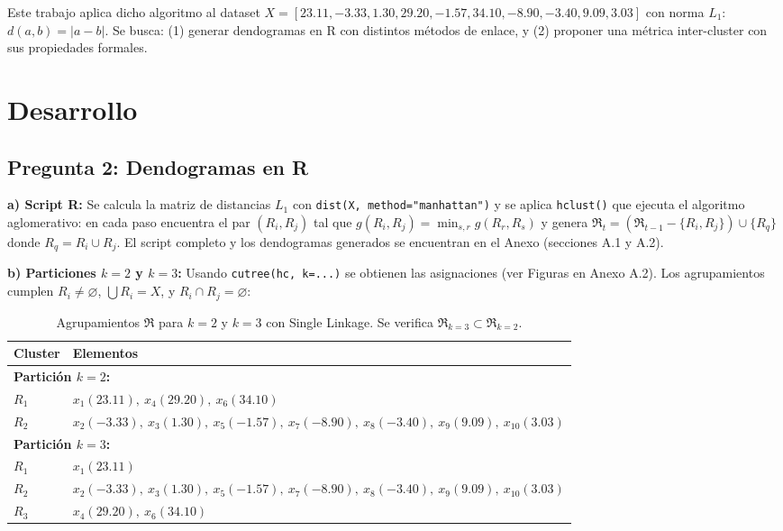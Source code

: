 \documentclass[10pt,a4paper]{article}
\begin{document}
Este trabajo aplica dicho algoritmo al dataset $X = [23.11, -3.33, 1.30, 29.20, -1.57, 34.10, -8.90, -3.40, 9.09, 3.03]$ con norma $L_1$: $d(a,b) = |a - b|$. Se busca: (1) generar dendogramas en R con distintos métodos de enlace, y (2) proponer una métrica inter-cluster con sus propiedades formales.

\section{Desarrollo}

\subsection{Pregunta 2: Dendogramas en R}

\textbf{a) Script R:} Se calcula la matriz de distancias $L_1$ con \texttt{dist(X, method="manhattan")} y se aplica \texttt{hclust()} que ejecuta el algoritmo aglomerativo: en cada paso encuentra el par $(R_i, R_j)$ tal que $g(R_i, R_j) = \min_{s,r} g(R_r, R_s)$ y genera $\Re_t = (\Re_{t-1} - \{R_i, R_j\}) \cup \{R_q\}$ donde $R_q = R_i \cup R_j$. El script completo y los dendogramas generados se encuentran en el Anexo (secciones A.1 y A.2).

\textbf{b) Particiones $k=2$ y $k=3$:} Usando \texttt{cutree(hc, k=...)} se obtienen las asignaciones (ver Figuras en Anexo A.2). Los agrupamientos cumplen $R_i \neq \varnothing$, $\bigcup R_i = X$, y $R_i \cap R_j = \varnothing$:

\begin{table}[H]
\centering
\footnotesize
\begin{tabular}{p{1.8cm} p{12cm}}
\toprule
\textbf{Cluster} & \textbf{Elementos} \\
\midrule
\multicolumn{2}{l}{\textbf{Partición $k=2$:}} \\
$R_1$ & $x_1(23.11),\ x_4(29.20),\ x_6(34.10)$ \\
$R_2$ & $x_2(-3.33),\ x_3(1.30),\ x_5(-1.57),\ x_7(-8.90),\ x_8(-3.40),\ x_9(9.09),\ x_{10}(3.03)$ \\
\midrule
\multicolumn{2}{l}{\textbf{Partición $k=3$:}} \\
$R_1$ & $x_1(23.11)$ \\
$R_2$ & $x_2(-3.33),\ x_3(1.30),\ x_5(-1.57),\ x_7(-8.90),\ x_8(-3.40),\ x_9(9.09),\ x_{10}(3.03)$ \\
$R_3$ & $x_4(29.20),\ x_6(34.10)$ \\
\bottomrule
\end{tabular}
\caption{Agrupamientos $\Re$ para $k=2$ y $k=3$ con Single Linkage. Se verifica $\Re_{k=3} \subset \Re_{k=2}$.}
\label{tab:particiones}
\end{table}
\end{document}

